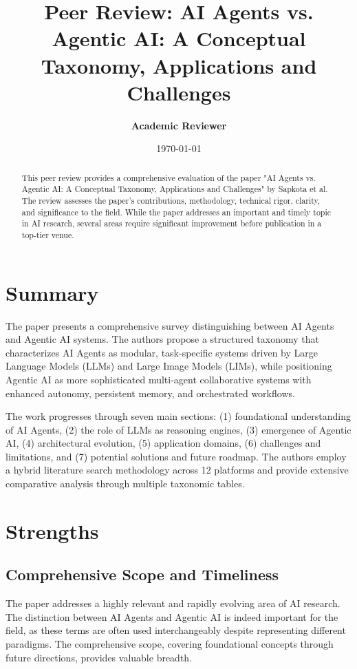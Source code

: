 \documentclass[12pt]{article}
\begin{document}
\title{\textbf{Peer Review: AI Agents vs. Agentic AI: A Conceptual Taxonomy, Applications and Challenges}}
\author{\textbf{Academic Reviewer}}
\date{\today}
\maketitle

\begin{abstract}
This peer review provides a comprehensive evaluation of the paper "AI Agents vs. Agentic AI: A Conceptual Taxonomy, Applications and Challenges" by Sapkota et al. The review assesses the paper's contributions, methodology, technical rigor, clarity, and significance to the field. While the paper addresses an important and timely topic in AI research, several areas require significant improvement before publication in a top-tier venue.
\end{abstract}

\section{Summary}

The paper presents a comprehensive survey distinguishing between AI Agents and Agentic AI systems. The authors propose a structured taxonomy that characterizes AI Agents as modular, task-specific systems driven by Large Language Models (LLMs) and Large Image Models (LIMs), while positioning Agentic AI as more sophisticated multi-agent collaborative systems with enhanced autonomy, persistent memory, and orchestrated workflows.

The work progresses through seven main sections: (1) foundational understanding of AI Agents, (2) the role of LLMs as reasoning engines, (3) emergence of Agentic AI, (4) architectural evolution, (5) application domains, (6) challenges and limitations, and (7) potential solutions and future roadmap. The authors employ a hybrid literature search methodology across 12 platforms and provide extensive comparative analysis through multiple taxonomic tables.

\section{Strengths}

\subsection{Comprehensive Scope and Timeliness}
The paper addresses a highly relevant and rapidly evolving area of AI research. The distinction between AI Agents and Agentic AI is indeed important for the field, as these terms are often used interchangeably despite representing different paradigms. The comprehensive scope, covering foundational concepts through future directions, provides valuable breadth.
\end{document}

